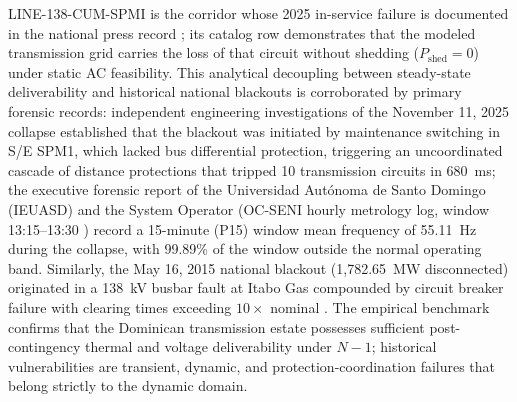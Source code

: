 LINE-138-CUM-SPMI is the corridor whose 2025 in-service failure is documented in the national press record \cite{listin2025}; its catalog row demonstrates that the modeled transmission grid carries the loss of that circuit without shedding ($P_{\mathrm{shed}} = 0$) under static AC feasibility. This analytical decoupling between steady-state deliverability and historical national blackouts is corroborated by primary forensic records: independent engineering investigations of the November 11, 2025 collapse \cite{uasdInformeSPM1_2025} established that the blackout was initiated by maintenance switching in S/E SPM1, which lacked bus differential protection, triggering an uncoordinated cascade of distance protections that tripped 10 transmission circuits in 680~ms; the executive forensic report of the Universidad Aut\'onoma de Santo Domingo (IEUASD) \cite{uasdInformeSPM1_2025} and the System Operator (OC-SENI hourly metrology log, window 13:15--13:30 \cite{ocseniScadaP15_2025}) record a 15-minute (P15) window mean frequency of 55.11~Hz during the collapse, with 99.89\% of the window outside the normal operating band. Similarly, the May 16, 2015 national blackout (1,782.65~MW disconnected) originated in a 138~kV busbar fault at Itabo Gas compounded by circuit breaker failure with clearing times exceeding $10\times$ nominal \cite{listinItaboGas_2015}. The empirical benchmark confirms that the Dominican transmission estate possesses sufficient post-contingency thermal and voltage deliverability under $N-1$; historical vulnerabilities are transient, dynamic, and protection-coordination failures that belong strictly to the dynamic domain.

